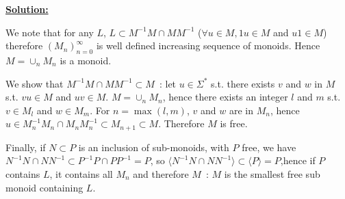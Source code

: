 \documentclass[a4paper,11pt]{exam}
\begin{document}
\begin{questions}
\begin{enumerate}
	{\bf \underline{Solution:}}
	
		We note that for any $L$,
		$L \subset M^{-1}M \cap MM^{-1}$ ($\forall u \in M, 1u \in M$ and
		$u1 \in M$) therefore $(M_n)_{n=0}^\infty$ is well defined increasing sequence of monoids.
		Hence $M = \cup_n M_n$ is a monoid.\smallskip
		
		We show that $M^{-1}M \cap MM^{-1} \subset M$~:
		let $u \in \Sigma^*$ s.t. there exists $v$ and $w$ in $M$ s.t. $vu \in M$ and $uv \in M$.
		$M = \cup_n M_n$, hence there exists an integer $l$ and $m$ s.t. $v \in M_l$ and $w \in M_m$.
		For $n=\max(l,m)$, $v$ and $w$ are in $M_n$, hence
		$u \in M_n^{-1}M_n \cap M_n M_n^{-1} \subset M_{n+1} \subset M$.
		Therefore $M$ is free.\smallskip
		
		Finally, if $N \subset P$ is an inclusion of sub-monoids, with $P$ free, we have $N^{-1}N \cap NN^{-1} \subset P^{-1}P \cap PP^{-1} = P$, so $\langle N^{-1}N \cap NN^{-1} \rangle \subset \langle P \rangle = P$,hence if $P$ contains $L$, it contains all $M_n$ and therefore
		$M$~: $M$ is the smallest free sub monoid containing $L$.
\end{enumerate}


\end{questions}
\end{document}
